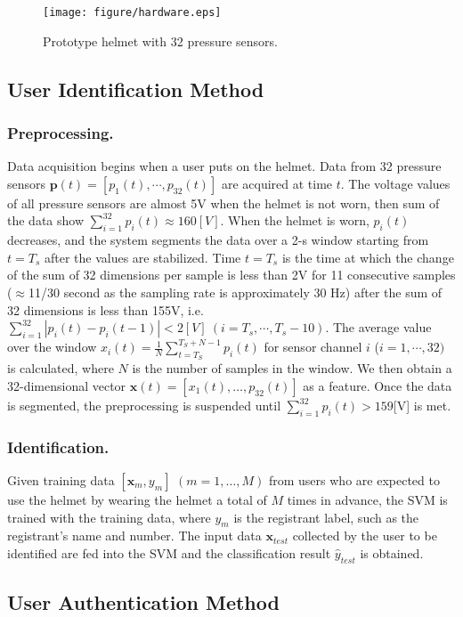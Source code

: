 \documentclass[sigconf,authordraft]{acmart}
\begin{document}
\begin{figure}[!t]
    \centering
    \texttt{[image: figure/hardware.eps]}
  \caption{Prototype helmet with 32 pressure sensors.}
  \label{fig:hard}
\end{figure}


\subsection{User Identification Method}

\subsubsection{Preprocessing.}
Data acquisition begins when a user puts on the helmet. Data from 32 pressure sensors $\bm{p}(t)=[p_1(t),\cdots,p_{32}(t)]$ are acquired at time $t$. The voltage values of all pressure sensors are almost 5V when the helmet is not worn, then sum of the data show $\sum_{i=1}^{32}p_i(t)\approx160[V]$. When the helmet is worn, $p_i(t)$ decreases, and the system segments the data over a 2-s window starting from $t=T_s$ after the values are stabilized. Time $t=T_s$ is the time at which the change of the sum of 32 dimensions per sample is less than 2V for 11 consecutive samples ($\approx$11/30 second as the sampling rate is approximately 30 Hz) after the sum of 32 dimensions is less than 155V, i.e. $\sum_{i=1}^{32}|p_i(t)-p_i(t-1)|<2[V]~(i=T_s,\cdots,T_s-10)$. The average value over the window $x_i(t)=\frac{1}{N}\sum_{t=T_S}^{T_S+N-1}p_i(t)$ for sensor channel $i$ ($i=1,\cdots,32)$ is calculated, where $N$ is the number of samples in the window. We then obtain a 32-dimensional vector $\bm{x}(t)=[x_{1}(t),\dots,p_{32}(t)]$ as a feature. Once the data is segmented, the preprocessing is suspended until $\sum_{i=1}^{32}p_i(t)>159$[V] is met.


\subsubsection{Identification.}
Given training data $[\bm{x}_m,y_m]$ $(m=1,\dots, M)$ from users who are expected to use the helmet by wearing the helmet a total of $M$ times in advance, the SVM is trained with the training data, where $y_m$ is the registrant label, such as the registrant's name and number. The input data $\bm{x}_{test}$ collected by the user to be identified are fed into the SVM and the classification result $\hat{y}_{test}$ is obtained.


\subsection{User Authentication Method}
\end{document}

